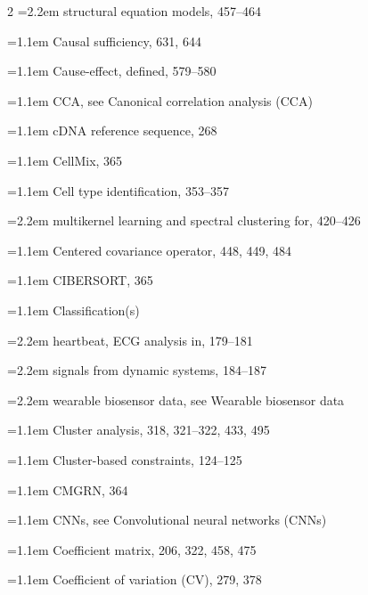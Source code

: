\begin{multicols}{2}
\noindent\hangindent=2.2em \hspace*{1.1em}structural equation models, 457--464\par
\noindent\hangindent=1.1em Causal sufficiency, 631, 644\par
\noindent\hangindent=1.1em Cause-effect, defined, 579--580\par
\noindent\hangindent=1.1em CCA, see Canonical correlation analysis (CCA)\par
\noindent\hangindent=1.1em cDNA reference sequence, 268\par
\noindent\hangindent=1.1em CellMix, 365\par
\noindent\hangindent=1.1em Cell type identification, 353--357\par
\noindent\hangindent=2.2em \hspace*{1.1em}multikernel learning and spectral clustering for, 420--426\par
\noindent\hangindent=1.1em Centered covariance operator, 448, 449, 484\par
\noindent\hangindent=1.1em CIBERSORT, 365\par
\noindent\hangindent=1.1em Classification(s)\par
\noindent\hangindent=2.2em \hspace*{1.1em}heartbeat, ECG analysis in, 179--181\par
\noindent\hangindent=2.2em \hspace*{1.1em}signals from dynamic systems, 184--187\par
\noindent\hangindent=2.2em \hspace*{1.1em}wearable biosensor data, see Wearable biosensor data\par
\noindent\hangindent=1.1em Cluster analysis, 318, 321--322, 433, 495\par
\noindent\hangindent=1.1em Cluster-based constraints, 124--125\par
\noindent\hangindent=1.1em CMGRN, 364\par
\noindent\hangindent=1.1em CNNs, see Convolutional neural networks (CNNs)\par
\noindent\hangindent=1.1em Coefficient matrix, 206, 322, 458, 475\par
\noindent\hangindent=1.1em Coefficient of variation (CV), 279, 378\par

\end{multicols}
